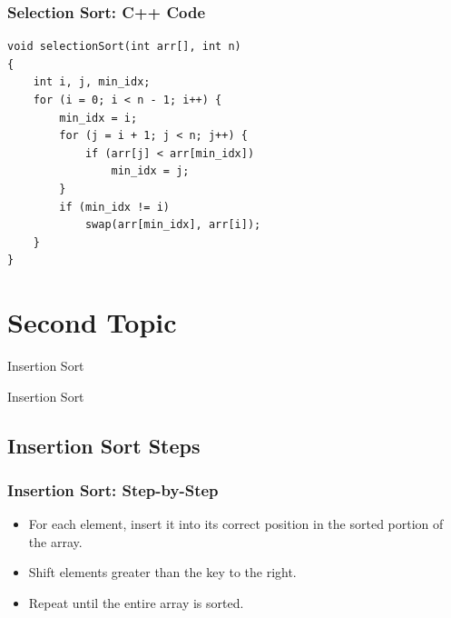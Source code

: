 \documentclass{beamer}
\begin{document}
\begin{frame}[c, fragile]
\frametitle{Selection Sort: C++ Code}

\begin{mybox}  %
\begin{verbatim}
void selectionSort(int arr[], int n) 
{ 
    int i, j, min_idx; 
    for (i = 0; i < n - 1; i++) { 
        min_idx = i; 
        for (j = i + 1; j < n; j++) { 
            if (arr[j] < arr[min_idx]) 
                min_idx = j; 
        } 
        if (min_idx != i) 
            swap(arr[min_idx], arr[i]); 
    } 
}
\end{verbatim}
\end{mybox}

\end{frame}

\section{Second Topic}
\begin{frame}{Insertion Sort}
  \begin{center}
    \Huge Insertion Sort
  \end{center}
\end{frame}

\subsection{Insertion Sort Steps}
\begin{frame}[c, fragile]
  \frametitle{Insertion Sort: Step-by-Step}

  \begin{itemize}
    \item For each element, insert it into its correct position in the sorted portion of the array.
    \item Shift elements greater than the key to the right.
    \item Repeat until the entire array is sorted.
  \end{itemize}

\end{frame}
\end{document}
